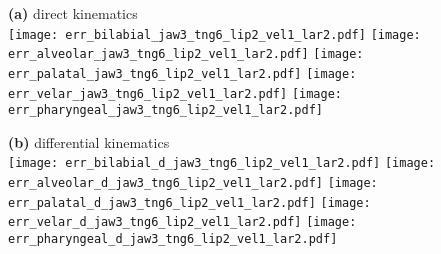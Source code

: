 \documentclass[varwidth=7.5in]{standalone}
\begin{document}
\raggedright

{\bf (a)} direct kinematics\\
\texttt{[image: err\_bilabial\_jaw3\_tng6\_lip2\_vel1\_lar2.pdf]}%
\texttt{[image: err\_alveolar\_jaw3\_tng6\_lip2\_vel1\_lar2.pdf]}%
\texttt{[image: err\_palatal\_jaw3\_tng6\_lip2\_vel1\_lar2.pdf]}%
\texttt{[image: err\_velar\_jaw3\_tng6\_lip2\_vel1\_lar2.pdf]}%
\texttt{[image: err\_pharyngeal\_jaw3\_tng6\_lip2\_vel1\_lar2.pdf]}

{\bf (b)} differential kinematics\\
\texttt{[image: err\_bilabial\_d\_jaw3\_tng6\_lip2\_vel1\_lar2.pdf]}%
\texttt{[image: err\_alveolar\_d\_jaw3\_tng6\_lip2\_vel1\_lar2.pdf]}%
\texttt{[image: err\_palatal\_d\_jaw3\_tng6\_lip2\_vel1\_lar2.pdf]}%
\texttt{[image: err\_velar\_d\_jaw3\_tng6\_lip2\_vel1\_lar2.pdf]}%
\texttt{[image: err\_pharyngeal\_d\_jaw3\_tng6\_lip2\_vel1\_lar2.pdf]}
\end{document}
